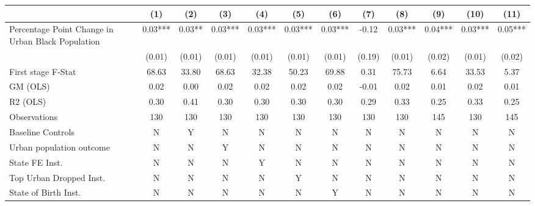  \begin{tabular}{l*{11}{c}} \toprule
                    &\multicolumn{1}{c}{(1)}   &\multicolumn{1}{c}{(2)}   &\multicolumn{1}{c}{(3)}   &\multicolumn{1}{c}{(4)}   &\multicolumn{1}{c}{(5)}   &\multicolumn{1}{c}{(6)}   &\multicolumn{1}{c}{(7)}   &\multicolumn{1}{c}{(8)}   &\multicolumn{1}{c}{(9)}   &\multicolumn{1}{c}{(10)}   &\multicolumn{1}{c}{(11)}   \\
\midrule
Percentage Point Change in Urban Black Population&     0.03***&     0.03** &     0.03***&     0.03***&     0.03***&     0.03***&    -0.12   &     0.03***&     0.04***&     0.03***&     0.05***\\
                    &   (0.01)   &   (0.01)   &   (0.01)   &   (0.01)   &   (0.01)   &   (0.01)   &   (0.19)   &   (0.01)   &   (0.02)   &   (0.01)   &   (0.02)   \\
\midrule
First stage F-Stat  &    68.63   &    33.80   &    68.63   &    32.38   &    50.23   &    69.88   &     0.31   &    75.73   &     6.64   &    33.53   &     5.37   \\
GM (OLS)            &     0.02   &     0.00   &     0.02   &     0.02   &     0.02   &     0.02   &    -0.01   &     0.02   &     0.01   &     0.02   &     0.01   \\
R2 (OLS)            &     0.30   &     0.41   &     0.30   &     0.30   &     0.30   &     0.30   &     0.29   &     0.33   &     0.25   &     0.33   &     0.25   \\
Observations        &      130   &      130   &      130   &      130   &      130   &      130   &      130   &      130   &      145   &      130   &      145   \\
Baseline Controls   &        N   &        Y   &        N   &        N   &        N   &        N   &        N   &        N   &        N   &        N   &        N   \\
Urban population outcome&        N   &        N   &        Y   &        N   &        N   &        N   &        N   &        N   &        N   &        N   &        N   \\
State FE Inst.      &        N   &        N   &        N   &        Y   &        N   &        N   &        N   &        N   &        N   &        N   &        N   \\
Top Urban Dropped Inst.&        N   &        N   &        N   &        N   &        Y   &        N   &        N   &        N   &        N   &        N   &        N   \\
State of Birth Inst.&        N   &        N   &        N   &        N   &        N   &        Y   &        N   &        N   &        N   &        N   &        N   \\

\end{tabular}
